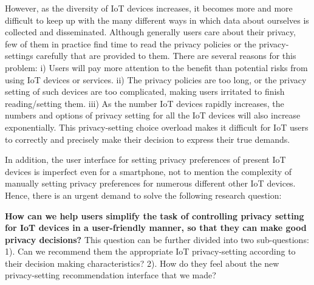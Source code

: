 However, as the diversity of IoT devices increases, it becomes more and more difficult to keep up with the many different ways in which data about ourselves is collected and disseminated. Although generally users care about their privacy, few of them in practice find time to read the privacy policies or the privacy-settings carefully that are provided to them. There are several reasons for this problem: i) Users will pay more attention to the benefit than potential risks from using IoT devices or services. ii) The privacy policies are too long, or the privacy setting of such devices are too complicated, making users irritated to finish reading/setting them. iii) As the number IoT devices rapidly increases, the numbers and options of privacy setting for all the IoT devices will also increase exponentially. This privacy-setting choice overload makes it difficult for IoT users to correctly and precisely make their decision to express their true demands. 

In addition, the user interface for setting privacy preferences of present IoT devices is imperfect even for a smartphone, not to mention the complexity of manually setting privacy preferences for numerous different other IoT devices. Hence, there is an urgent demand to solve the following research question: 

\textbf{How can we help users simplify the task of controlling privacy setting for IoT devices in a user-friendly manner, so that they can make good privacy decisions?} This question can be further divided into two sub-questions: 1). Can we recommend them the appropriate IoT privacy-setting according to their decision making characteristics? 2). How do they feel about the new privacy-setting recommendation interface that we made?

